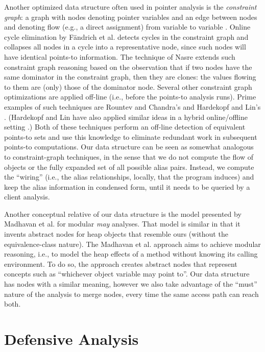 Another optimized data structure often used in pointer analysis is the \emph{constraint graph}: a graph with nodes denoting pointer variables and an edge between nodes  and  denoting flow (e.g., a direct assignment) from variable  to variable . Online cycle elimination by F\"{a}ndrich et al. \cite{pldi:1998:Fahndrich} detects cycles in the constraint graph and collapses all nodes in a cycle into a representative node, since such nodes will have identical points-to information. The technique of Nasre \cite{ismm:2012:Nasre} extends such constraint graph reasoning based on the observation that if two nodes have the same dominator in the constraint graph, then they are clones: the values flowing to them are (only) those of the dominator node. Several other constraint graph optimizations are applied off-line (i.e., before the points-to analysis runs). Prime examples of such techniques are Rountev and Chandra's \cite{pldi:2000:Rountev} and Hardekopf and Lin's \cite{sas:2007:Hardekopf}. (Hardekopf and Lin have also applied similar ideas in a hybrid online/offline setting \cite{pldi:2007:Hardekopf}.) Both of these techniques perform an off-line detection of equivalent points-to sets and use this knowledge to eliminate redundant work in subsequent points-to computations. Our data structure can be seen as somewhat analogous to constraint-graph techniques, in the sense that we do not compute the flow of objects or the fully expanded set of all possible alias pairs. Instead, we compute the ``wiring'' (i.e., the alias relationships, locally, that the program induces) and keep the alias information in condensed form, until it needs to be queried by a client analysis.

Another conceptual relative of our data structure is the model presented by Madhavan et al. \cite{article:2015:Madhavan} for modular \emph{may} analyses. That model is similar in that it invents abstract nodes for heap objects that resemble ours (without the equivalence-class nature). The Madhavan et al. approach aims to achieve modular reasoning, i.e., to model the heap effects of a method without knowing its calling environment. To do so, the approach creates abstract nodes that represent concepts such as ``whichever object variable  may point to''. Our data structure has nodes with a similar meaning, however we also take advantage of the ``must'' nature of the analysis to merge nodes, every time the same access path can reach both.



\section{Defensive Analysis}

